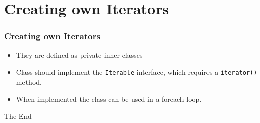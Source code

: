 \documentclass{beamer}
\begin{document}
\section{Creating own Iterators}
\begin{frame}
\frametitle{Creating own Iterators}
\begin{itemize}
\item They are defined as {\color{red} private inner classes}
\item Class should implement the \texttt{Iterable} interface, which requires a \texttt{iterator()} method.
\item When implemented the class can be used in a foreach loop.
\cust
\end{itemize}
\end{frame}
\begin{frame} 
\Huge{\centerline{The End}}
\end{frame}
\end{document}
